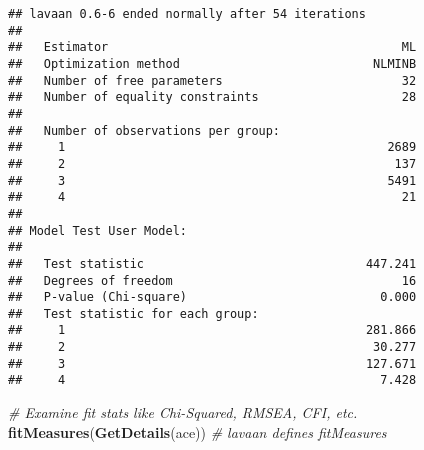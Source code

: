 \documentclass[smallextended]{svjour3}       %
\newenvironment{Shaded}{\begin{snugshade}}{\end{snugshade}}
\newcommand{\CommentTok}[1]{\textcolor[rgb]{0.56,0.35,0.01}{\textit{#1}}}
\newcommand{\KeywordTok}[1]{\textcolor[rgb]{0.13,0.29,0.53}{\textbf{#1}}}
\newcommand{\NormalTok}[1]{#1}
\begin{document}
\begin{verbatim}
## lavaan 0.6-6 ended normally after 54 iterations
## 
##   Estimator                                         ML
##   Optimization method                           NLMINB
##   Number of free parameters                         32
##   Number of equality constraints                    28
##                                                       
##   Number of observations per group:                   
##     1                                             2689
##     2                                              137
##     3                                             5491
##     4                                               21
##                                                       
## Model Test User Model:
##                                                       
##   Test statistic                               447.241
##   Degrees of freedom                                16
##   P-value (Chi-square)                           0.000
##   Test statistic for each group:
##     1                                          281.866
##     2                                           30.277
##     3                                          127.671
##     4                                            7.428
\end{verbatim}

\begin{Shaded}
\begin{Highlighting}[]
\CommentTok{# Examine fit stats like Chi-Squared, RMSEA, CFI, etc.}
\KeywordTok{fitMeasures}\NormalTok{(}\KeywordTok{GetDetails}\NormalTok{(ace)) }\CommentTok{# lavaan defines fitMeasures }
\end{Highlighting}
\end{Shaded}
\end{document}
